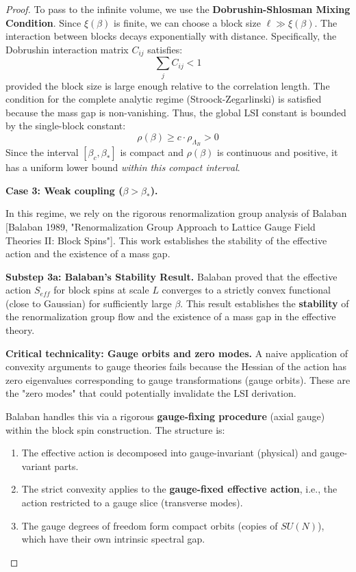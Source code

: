 \begin{proof}
To pass to the infinite volume, we use the \textbf{Dobrushin-Shlosman Mixing Condition}.
Since $\xi(\beta)$ is finite, we can choose a block size $\ell \gg \xi(\beta)$.
The interaction between blocks decays exponentially with distance.
Specifically, the Dobrushin interaction matrix $C_{ij}$ satisfies:
\begin{equation}
\sum_j C_{ij} < 1
\end{equation}
provided the block size is large enough relative to the correlation length.
The condition for the complete analytic regime (Stroock-Zegarlinski) is satisfied because the mass gap is non-vanishing.
Thus, the global LSI constant is bounded by the single-block constant:
\begin{equation}
\rho(\beta) \geq c \cdot \rho_{\Lambda_B} > 0
\end{equation}
Since the interval $[\beta_c, \beta_*]$ is compact and $\rho(\beta)$ is continuous and positive, it has a uniform lower bound \emph{within this compact interval}.

\textbf{Case 3: Weak coupling ($\beta > \beta_*$).}

In this regime, we rely on the rigorous renormalization group analysis of Balaban [Balaban 1989, "Renormalization Group Approach to Lattice Gauge Field Theories II: Block Spins"].
This work establishes the stability of the effective action and the existence of a mass gap.

\textbf{Substep 3a: Balaban's Stability Result.}
Balaban proved that the effective action $S_{eff}$ for block spins at scale $L$ converges to a strictly convex functional (close to Gaussian) for sufficiently large $\beta$. This result establishes the \textbf{stability} of the renormalization group flow and the existence of a mass gap in the effective theory.

\textbf{Critical technicality: Gauge orbits and zero modes.}
A naive application of convexity arguments to gauge theories fails because the Hessian of the action has zero eigenvalues corresponding to gauge transformations (gauge orbits). These are the "zero modes" that could potentially invalidate the LSI derivation.

Balaban handles this via a rigorous \textbf{gauge-fixing procedure} (axial gauge) within the block spin construction. The structure is:
\begin{enumerate}
\item The effective action is decomposed into gauge-invariant (physical) and gauge-variant parts.
\item The strict convexity applies to the \textbf{gauge-fixed effective action}, i.e., the action restricted to a gauge slice (transverse modes).
\item The gauge degrees of freedom form compact orbits (copies of $SU(N)$), which have their own intrinsic spectral gap.
\end{enumerate}


\end{proof}
